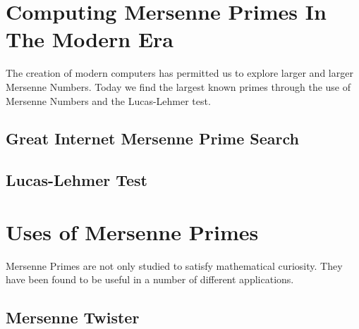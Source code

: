 \section{Computing Mersenne Primes In The Modern Era}
The creation of modern computers has permitted us to explore larger and larger Mersenne Numbers.  Today we find the largest known primes through the use of Mersenne Numbers and the Lucas-Lehmer test. 
\subsection{Great Internet Mersenne Prime Search}
\subsection{Lucas-Lehmer Test}
\section{Uses of Mersenne Primes}
Mersenne Primes are not only studied to satisfy mathematical curiosity.  They have been found to be useful in a number of different applications.  
\subsection{Mersenne Twister}
